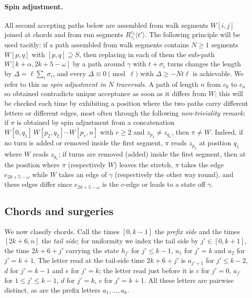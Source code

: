 \documentclass[11pt]{article}
\theoremstyle{definition}
\begin{document}
\paragraph{Spin adjustment.}
All second accepting paths below are assembled from walk segments $W[i,j]$
joined at chords and from run segments $R_{\tau_1}^{\tau_2}\langle t'\rangle$.
The following principle will be used tacitly: if a path assembled from walk
segments contains $N\ge1$ segments $W[p,q]$ with $[p,q]\supseteq S$, then
replacing in each of them the sub-path $W[k+\alpha,2k+5-\omega]$ by a path
around $\gamma$ with $t+\sigma_i$ turns changes the length by
$\Delta=\ell\sum_i\sigma_i$, and every $\Delta\equiv0\pmod\ell$ with
$\Delta\ge-Nt\ell$ is achievable. We refer to this as \emph{spin adjustment
in $N$ traversals}. A path of length $n$ from $c_0$ to $c_n$ so obtained
contradicts unique acceptance as soon as it differs from $W$; this will be
checked each time by exhibiting a position where the two paths carry
different letters or different edges, most often through the following
\emph{non-triviality remark}: if $\pi$ is obtained by spin adjustment from
a concatenation $W[0,q_1]\,W[p_2,q_2]\cdots W[p_r,n]$ with $r\ge2$ and
$z_{p_2}\ne z_{q_1}$, then $\pi\ne W$. Indeed, if no turn is added or removed
inside the first segment, $\pi$ reads $z_{p_2}$ at position $q_1$ where $W$
reads $z_{q_1}$; if turns are removed (added) inside the first segment, then
at the position where $\pi$ (respectively $W$) leaves the stretch, $\pi$ takes
the edge $e_{2k+5-\omega}$ while $W$ takes an edge of $\gamma$ (respectively
the other way round), and these edges differ since $e_{2k+5-\omega}$ is the
$c$-edge or leads to a state off $\gamma$.

\subsection{Chords and surgeries}\label{sec:surgery}

We now classify chords. Call the times $[0,k-1]$ the \emph{prefix side} and
the times $[2k+6,n]$ the \emph{tail side}; for uniformity we index the tail
side by $j'\in[0,k+1]$, the time $2k+6+j'$ carrying the state $h_{j'}$ for
$j'\le k-1$, $u_1$ for $j'=k$ and $u_2$ for $j'=k+1$. The letter read at the
tail-side time $2k+6+j'$ is $a_{j'+1}$ for $j'\le k-2$, $d$ for $j'=k-1$ and
$e$ for $j'=k$; the letter read just before it is $c$ for $j'=0$, $a_{j'}$ for
$1\le j'\le k-1$, $d$ for $j'=k$, $e$ for $j'=k+1$. All these letters are
pairwise distinct, as are the prefix letters $a_1,\dots,a_k$.
\end{document}
